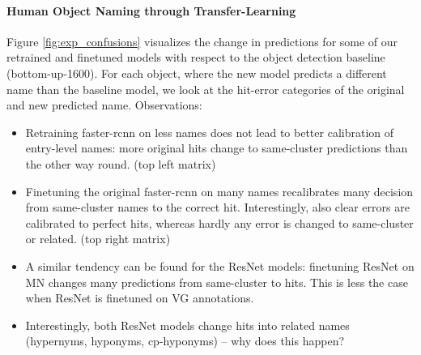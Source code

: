\paragraph{Human Object Naming through Transfer-Learning} Figure \ref{fig:exp_confusions} visualizes the change in predictions for  some of our retrained and finetuned models with respect to the object detection baseline (bottom-up-1600). For each object, where the new model predicts a different name than the baseline model, we look at the hit-error categories of the original and new predicted name. Observations:
\begin{itemize}
	\item Retraining faster-rcnn on less names does not lead to better calibration of entry-level names: more original hits change to same-cluster predictions than the other way round. (top left matrix)
	\item Finetuning the original faster-rcnn on many names recalibrates many decision from same-cluster names to the correct hit. Interestingly, also clear errors are calibrated to perfect hits, whereas hardly any error is changed to same-cluster or related.  (top right matrix)
	\item A similar tendency can be found for the ResNet models: finetuning ResNet on MN changes many predictions from same-cluster to hits. This is less the case when ResNet is finetuned on VG annotations.
	\item Interestingly, both ResNet models change hits into related names (hypernyms, hyponyms, cp-hyponyms) -- why does this happen?
\end{itemize}


